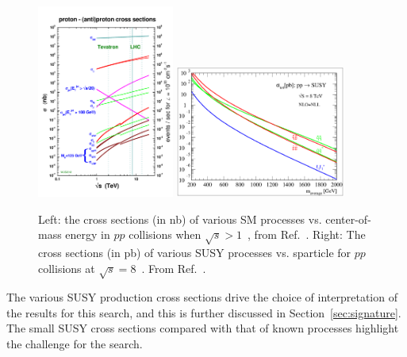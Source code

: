 \begin{figure}[h!]
  \begin{center}
      \includegraphics[width=0.40\textwidth,trim=0 2cm 0 0]{figures/crosssections2012_v5}
      \includegraphics[width=0.5\textwidth, ]{figures/nlonll_lhc8_tpformat.eps}
      \caption{\label{fig:crossSec} Left: the cross sections (in nb) of various SM processes vs. center-of-mass
              energy in $pp$ collisions when $\sqrt{s}>1$~\TeV, from Ref.~\cite{stirling-xs}. Right: 
              The cross sections (in pb) of various SUSY processes vs. sparticle for $pp$ collisions
              at $\sqrt{s}=8$~\TeV. From Ref.~\cite{Beenakker:1996ed}.} 
  \end{center}
\end{figure}

The various SUSY production cross sections drive the choice of interpretation of the results for 
this search, and this is further discussed in Section~\ref{sec:signature}. The small SUSY cross
sections compared with that of known processes highlight the challenge for the search.

